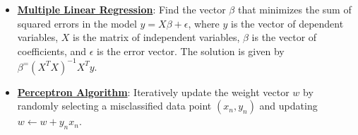 \documentclass{article}%
\begin{document}
\begin{itemize}[leftmargin=*]%
\item \href{https://purdue.brightspace.com/d2l/common/assets/pdfjs-d2l-dist/1.0.14-legacy/web/viewer.html?file=\%2Fcontent\%2Fenforced\%2F1095467-wl.202510.CS.24300.001\%2F05L2-ML Basics.pdf\%3Fou\%3D1095467\&lang=en-us\&container=d2l-fileviewer-rendered-pdf\&fullscreen=d2l-fileviewer-rendered-pdf-dialog\&height=667#page=11}{\textbf{Multiple Linear Regression}}: Find the vector $\beta$ that minimizes the sum of squared errors in the model $y = X\beta + \epsilon$, where $y$ is the vector of dependent variables, $X$ is the matrix of independent variables, $\beta$ is the vector of coefficients, and $\epsilon$ is the error vector. The solution is given by $\beta^ = (X^TX)^{-1}X^Ty$.%
\item \href{https://purdue.brightspace.com/d2l/common/assets/pdfjs-d2l-dist/1.0.14-legacy/web/viewer.html?file=\%2Fcontent\%2Fenforced\%2F1095467-wl.202510.CS.24300.001\%2F05L2-ML Basics.pdf\%3Fou\%3D1095467\&lang=en-us\&container=d2l-fileviewer-rendered-pdf\&fullscreen=d2l-fileviewer-rendered-pdf-dialog\&height=667#page=30}{\textbf{Perceptron Algorithm}}: Iteratively update the weight vector $w$ by randomly selecting a misclassified data point $(x_n, y_n)$ and updating $w \leftarrow w + y_nx_n$.%
\end{itemize}%
\end{document}
